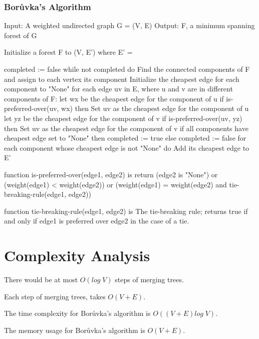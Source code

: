 \documentclass[
	11pt, %
]{beamer}
\begin{document}
\begin{frame}[fragile,shrink=4]
    \frametitle{Borůvka's Algorithm}
    \begin{semiverbatim}
        Input: A weighted undirected graph G = (V, E)
        Output: F, a minimum spanning forest of G
        
        Initialize a forest F to (V, E') where E' = {}
        
        completed := false
        while not completed do
            Find the connected components of F and assign to each vertex its component
            Initialize the cheapest edge for each component to "None"
            for each edge uv in E, where u and v are in different components of F:
                let wx be the cheapest edge for the component of u
                if is-preferred-over(uv, wx) then
                    Set uv as the cheapest edge for the component of u
                let yz be the cheapest edge for the component of v
                if is-preferred-over(uv, yz) then
                    Set uv as the cheapest edge for the component of v
            if all components have cheapest edge set to "None" then
                completed := true
            else
                completed := false
                for each component whose cheapest edge is not "None" do
                    Add its cheapest edge to E'

        function is-preferred-over(edge1, edge2) is
            return (edge2 is "None") or
                    (weight(edge1) < weight(edge2)) or
                    (weight(edge1) = weight(edge2) and tie-breaking-rule(edge1, edge2))
        
        function tie-breaking-rule(edge1, edge2) is
            The tie-breaking rule; returns true if and only if edge1
            is preferred over edge2 in the case of a tie.
    \end{semiverbatim}
\end{frame}

\section{Complexity Analysis}
\begin{frame}
    \tableofcontentscurrent
\end{frame}

\begin{frame}
    \begin{lemma}
        There would be at most $O(log \; V)$ steps of merging trees. 
    \end{lemma}
    \begin{lemma}
        Each step of merging trees, takes $O(V + E)$.
    \end{lemma}
    \begin{fact}
        The time complexity for Borůvka’s algorithm is $O((V + E) log \; V)$.
    \end{fact}

    \begin{fact}
        The memory usage for Borůvka’s algorithm is $O(V + E)$.
    \end{fact}
\end{frame}
\end{document}
